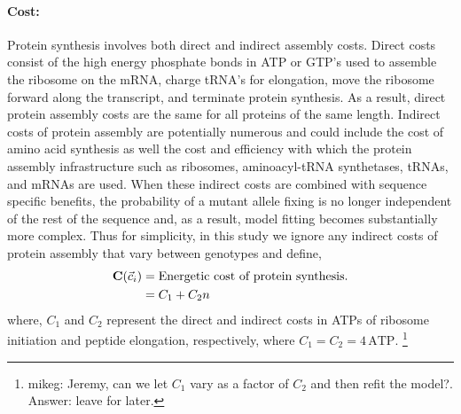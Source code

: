 \documentclass{article}
\newcommand{\Costcveci}{\ensuremath{\Cost(\cveci)}\xspace}
\newcommand{\Cost}{\ensuremath{\text{\textbf{C}}}\xspace}
\newcommand{\cveci}{\ensuremath{\cvec_i}\xspace}
\newcommand{\cvec}{\ensuremath{\Vec{c}}\xspace}
\begin{document}
\paragraph*{Cost:}
Protein synthesis involves both direct and indirect assembly costs.
Direct costs consist of the high energy phosphate bonds in ATP or GTP's used to assemble the ribosome on the mRNA, charge tRNA's for elongation, move the ribosome forward along the transcript, and terminate protein synthesis.
As a result, direct protein assembly costs are the same for all proteins of the same length.
Indirect costs of protein assembly are potentially numerous and could include the cost of amino acid synthesis as well the cost and efficiency with which the protein assembly infrastructure such as ribosomes, aminoacyl-tRNA synthetases, tRNAs, and mRNAs are used.
When these indirect costs are combined with sequence specific benefits, the probability of a mutant allele fixing is no longer independent of the rest of the sequence \citep{GilchristEtAl2015} and, as a result, model fitting becomes substantially more complex.
Thus for simplicity, in this study we ignore any indirect costs of protein assembly that vary between genotypes and define,
\begin{align}
\label{eq:defineCost}
  \Costcveci  &= \text{Energetic cost of protein synthesis.}\\
  &= C_1 + C_2 n
\end{align}
where, $C_1$ and $C_2$ represent the direct and indirect costs in ATPs of ribosome initiation and peptide elongation, respectively, where $C_1 = C_2 = 4  \,\text{ATP}$.
\footnote{mikeg: Jeremy, can we let $C_1$ vary as a factor of $C_2$ and then refit the model?.
Answer: leave for later.}
 
\end{document}
